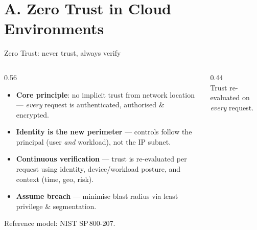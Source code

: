 \documentclass[aspectratio=169,10pt]{beamer}
\newcommand{\term}[1]{{\color{awsink}\textbf{#1}}}
\begin{document}
\section{A. Zero Trust in Cloud Environments}

\begin{frame}{Zero Trust: never trust, always verify}
  \begin{columns}[T]
    \begin{column}{0.56\textwidth}\small
      \begin{itemize}
        \item \term{Core principle}: no implicit trust from network location ---
              \emph{every} request is authenticated, authorised \& encrypted.
        \item \term{Identity is the new perimeter} --- controls follow the principal
              (user \emph{and} workload), not the IP subnet.
        \item \term{Continuous verification} --- trust is re-evaluated per request using
              identity, device/workload posture, and context (time, geo, risk).
        \item \term{Assume breach} --- minimise blast radius via least privilege \& segmentation.
      \end{itemize}
      {\footnotesize\color{midgray}Reference model: NIST SP\,800-207.}
    \end{column}
    \begin{column}{0.44\textwidth}
      \centering
      \\[0.3em]{\scriptsize\color{midgray}Trust re-evaluated on \emph{every} request.}
    \end{column}
  \end{columns}
\end{frame}
\end{document}
